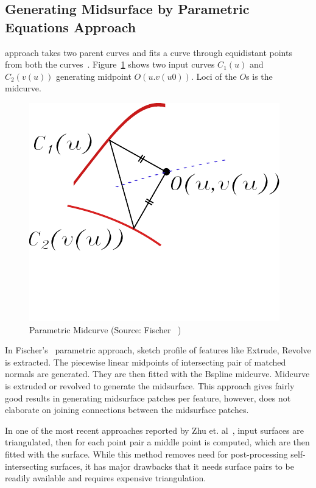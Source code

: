 \subsection{Generating Midsurface by Parametric Equations Approach}	
 approach takes two parent curves and fits a curve through equidistant points from both the curves~\cite{Elber1999, Fischer1997}. Figure~\ref{fig:litsurvey:parametric} shows two input curves $C_1(u)$ and $C_2(v(u))$ generating midpoint $O(u.v(u0))$. Loci of the $O$s is the midcurve. 


	\begin{figure} [!h]
		\centering
		\includegraphics[width=0.4\linewidth]{..//Common/images/MidcurvesDefn}
		\caption{Parametric Midcurve (Source: Fischer~\cite{Fischer1997} )}
		\label{fig:litsurvey:parametric}
	\end{figure}
	

In Fischer's~\cite{Fischer1997} parametric approach, sketch profile of features like Extrude, Revolve is extracted. The piecewise linear midpoints  of intersecting pair of matched normals are generated. They are then fitted with the Bspline midcurve. Midcurve is extruded or revolved to generate the midsurface.  This approach gives fairly good results in generating midsurface patches per feature, however, does not elaborate on joining connections between the midsurface patches.

In one of the most recent approaches reported by Zhu et. al~\cite{Zhu2015, Zhu2016}, input surfaces are triangulated, then for each point pair a middle point is computed, which are then fitted with the surface. While this method removes need for post-processing self-intersecting surfaces, it has major drawbacks that it needs surface pairs to be readily available and requires expensive triangulation.

